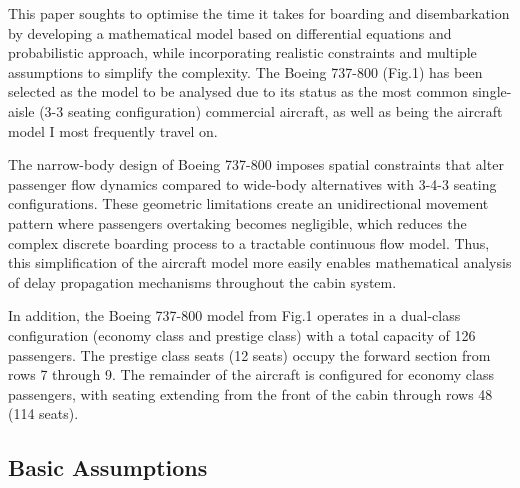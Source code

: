 \documentclass[a4paper,12pt]{article}
\begin{document}
This paper soughts to optimise the time it takes for boarding and disembarkation by developing a mathematical model based on differential equations and probabilistic approach, while incorporating realistic constraints and multiple assumptions to simplify the complexity. The Boeing 737-800 (Fig.1) has been selected as the model to be analysed due to its status as the most common single-aisle (3-3 seating configuration) commercial aircraft, as well as being the aircraft model I most frequently travel on. 

The narrow-body design of Boeing 737-800 imposes spatial constraints that alter passenger flow dynamics compared to wide-body alternatives with 3-4-3 seating configurations. These geometric limitations create an unidirectional movement pattern where passengers overtaking becomes negligible, which reduces the complex discrete boarding process to a tractable continuous flow model. Thus, this simplification of the aircraft model more easily enables mathematical analysis of delay propagation mechanisms throughout the cabin system. 

In addition, the Boeing 737-800 model from Fig.1 operates in a dual-class configuration (economy class and prestige class) with a total capacity of 126 passengers. The prestige class seats (12 seats) occupy the forward section from rows 7 through 9. The remainder of the aircraft is configured for economy class passengers, with seating extending from the front of the cabin through rows 48 (114 seats).

\subsection{Basic Assumptions}
\end{document}
